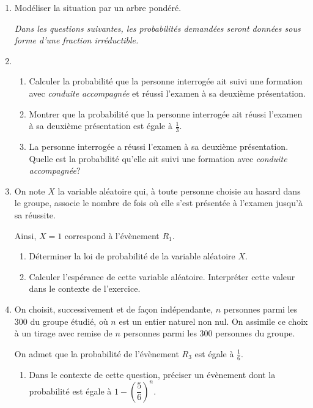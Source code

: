 \begin{enumerate}
\item  Modéliser la situation par un arbre pondéré.

\emph{Dans les questions suivantes, les probabilités demandées seront données sous forme d’une fraction irréductible.}

\item 
	\begin{enumerate}
		\item Calculer la probabilité que la personne interrogée ait suivi une formation avec \emph{conduite accompagnée} et réussi l’examen à sa deuxième présentation.
		\item Montrer que la probabilité que la personne interrogée ait réussi l’examen à sa deuxième présentation est égale à $\frac{1}{3}$.
		\item La personne interrogée a réussi l’examen à sa deuxième présentation. Quelle est la probabilité qu’elle ait suivi une formation avec \emph{conduite accompagnée}?
	\end{enumerate}
\item On note $X$ la variable aléatoire qui, à toute personne choisie au hasard dans le groupe, associe le nombre de fois où elle s’est présentée à l’examen jusqu’à sa réussite.

Ainsi, ${X=1}$ correspond à l’évènement $R_1$.
	\begin{enumerate}
		\item  Déterminer la loi de probabilité de la variable aléatoire $X$.
		\item Calculer l’espérance de cette variable aléatoire. Interpréter cette valeur dans le contexte de l’exercice.
	\end{enumerate}
\item On choisit, successivement et de façon indépendante, $n$ personnes parmi les 300 du groupe étudié, où $n$ est un entier naturel non nul. On assimile ce choix à un tirage avec remise de $n$ personnes parmi les 300 personnes du groupe.

On admet que la probabilité de l’évènement $R_3$ est égale à $\frac{1}{6}$.
	\begin{enumerate}
		\item  Dans le contexte de cette question, préciser un évènement dont la probabilité est égale à $1-\left(\dfrac{5}{6}\right)^n$.


\end{enumerate}
\end{enumerate}
